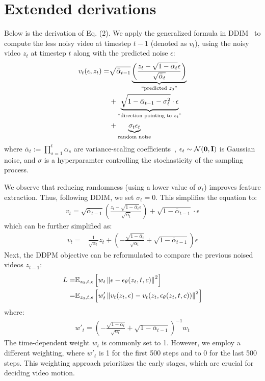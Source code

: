\clearpage
\appendix
\setcounter{page}{1}
\maketitlesupplementary

\section{Extended derivations}
\label{sec:derivation}

Below is the derivation of Eq. (2). We apply the generalized formula in DDIM~\cite{ddim} to compute the less noisy video at timestep $t-1$ (denoted as $v_t$), using the noisy video $z_t$ at timestep $t$ along with the predicted noise $\epsilon$:
\begin{align}
    v_{t}(\epsilon,z_t)=
&\sqrt{\bar\alpha_{t-1}} \underbrace{\left(\frac{z_t-\sqrt{1-\bar\alpha_t}\epsilon}{\sqrt{\bar\alpha_t}}\right)}_{\text{``predicted } z_0 \text{''}}\notag\\
&+\underbrace{\sqrt{1-\bar\alpha_{t-1}-\sigma_t^2}\cdot\epsilon}_{\text{``direction pointing to } z_t \text{''}}\notag\\
&+\underbrace{\sigma_t\epsilon_t}_{\text{random noise}}
  \label{eq:derivation}
\end{align}
where $\bar\alpha_t:=\prod_{s=1}^t\alpha_s$ are variance-scaling coefficients~\cite{ddpm}, $\epsilon_t\sim\mathcal N(\bf{0},\bf{I})$ is Gaussian noise, and $\sigma$ is a hyperparamter controlling the stochasticity of the sampling process.

We observe that reducing randomness (\ie using a lower value of $\sigma_t$) improves feature extraction. Thus, following DDIM, we set $\sigma_t=0$. This simplifies the equation to:
\begin{align}
    v_{t}=
\sqrt{\bar\alpha_{t-1}} \left(\frac{z_t-\sqrt{1-\bar\alpha_t}\epsilon}{\sqrt{\bar\alpha_t}}\right)
+\sqrt{1-\bar\alpha_{t-1}}\cdot\epsilon
\end{align}
which can be further simplified as:
\begin{align}
    v_{t}=
&\frac 1 {\sqrt{\alpha_{t}}}z_t+\left(-\frac {\sqrt{1-\bar\alpha_t}} {\sqrt{\alpha_{t}}}+\sqrt{1-\bar\alpha_{t-1}}\right)\epsilon
\end{align}
Next, the DDPM objective can be reformulated to compare the previous noised videos $z_{t-1}$:
\begin{align}
    L=&\mathbb{E}_{z_0, t, \epsilon}\left[w_t\left\|
\epsilon-\epsilon_{\theta}(z_t, t, c)
\right\|^2\right]\\
=&\mathbb{E}_{z_0, t, \epsilon}\left[w'_t\left\|
v_t(z_t,\epsilon)-v_t(z_t,\epsilon_{\theta}(z_t, t, c))
\right\|^2\right]
\end{align}
where:
\begin{align}
w'_t=\left(-\frac {\sqrt{1-\bar\alpha_t}} {\sqrt{\alpha_{t}}}+\sqrt{1-\bar\alpha_{t-1}}\right)^{-1}w_t
\end{align}
The time-dependent weight $w_t$ is commonly set to 1. However, we employ a different weighting, where $w'_t$ is 1 for the first 500 steps and to 0 for the last 500 steps. This weighting approach prioritizes the early stages, which are crucial for deciding video motion.


